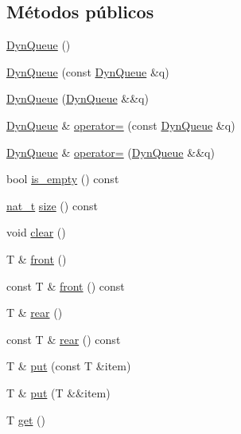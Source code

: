 \subsection*{Métodos públicos}
\begin{DoxyCompactItemize}
\item 
\hyperlink{class_designar_1_1_dyn_queue_a947ebdf2503509cdacd5e34a6de29197}{Dyn\+Queue} ()
\item 
\hyperlink{class_designar_1_1_dyn_queue_a612ed3480c13f60be2f9706601f846b1}{Dyn\+Queue} (const \hyperlink{class_designar_1_1_dyn_queue}{Dyn\+Queue} \&q)
\item 
\hyperlink{class_designar_1_1_dyn_queue_ad5d501cf675b1d5b2c0e0b6799cf77ec}{Dyn\+Queue} (\hyperlink{class_designar_1_1_dyn_queue}{Dyn\+Queue} \&\&q)
\item 
\hyperlink{class_designar_1_1_dyn_queue}{Dyn\+Queue} \& \hyperlink{class_designar_1_1_dyn_queue_a8936e37e8c235dea1201934067440eb7}{operator=} (const \hyperlink{class_designar_1_1_dyn_queue}{Dyn\+Queue} \&q)
\item 
\hyperlink{class_designar_1_1_dyn_queue}{Dyn\+Queue} \& \hyperlink{class_designar_1_1_dyn_queue_ad5d4745d5e0c3640a413897f8d72ed25}{operator=} (\hyperlink{class_designar_1_1_dyn_queue}{Dyn\+Queue} \&\&q)
\item 
bool \hyperlink{class_designar_1_1_dyn_queue_ae0c3b0a4a0c5028a12d8a564182d2b3e}{is\+\_\+empty} () const
\item 
\hyperlink{namespace_designar_aa72662848b9f4815e7bf31a7cf3e33d1}{nat\+\_\+t} \hyperlink{class_designar_1_1_dyn_queue_a3fa0e8fd7d197de1a60caae23b5c305e}{size} () const
\item 
void \hyperlink{class_designar_1_1_dyn_queue_adc396896fa4b333de8ae60ed8b8da2ea}{clear} ()
\item 
T \& \hyperlink{class_designar_1_1_dyn_queue_a910f0dc9d3bf1c1b2363730db842980d}{front} ()
\item 
const T \& \hyperlink{class_designar_1_1_dyn_queue_ae8e017797ad0ccd8a0568f69f8adedbf}{front} () const
\item 
T \& \hyperlink{class_designar_1_1_dyn_queue_a735f5a7d869689994d81d593b1924c68}{rear} ()
\item 
const T \& \hyperlink{class_designar_1_1_dyn_queue_a378a92d95bb351f2cc1b8fb80f6c9525}{rear} () const
\item 
T \& \hyperlink{class_designar_1_1_dyn_queue_a4564ed0e64b06d4a96ff020ba3456706}{put} (const T \&item)
\item 
T \& \hyperlink{class_designar_1_1_dyn_queue_a53c4e234aacf16fdb7e99625edadad61}{put} (T \&\&item)
\item 
T \hyperlink{class_designar_1_1_dyn_queue_a70b3f577ec11287fe63766de53a2cb56}{get} ()
\end{DoxyCompactItemize}


